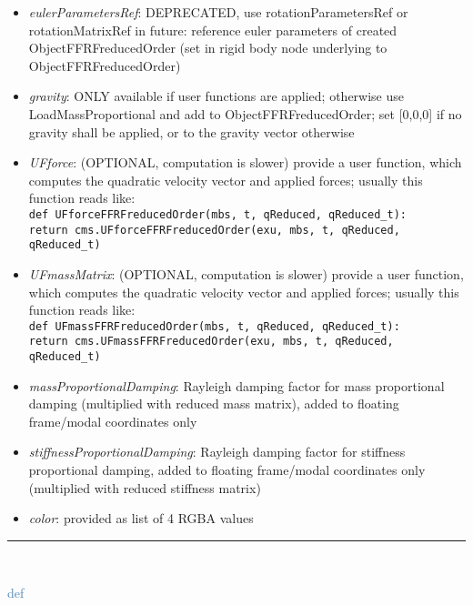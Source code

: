 \begin{itemize}[leftmargin=1.4cm]
\begin{itemize}[leftmargin=0.5cm]
\begin{itemize}[leftmargin=1.4cm]
\begin{itemize}[leftmargin=0.5cm]
\begin{itemize}[leftmargin=0.7cm]
\begin{itemize}[leftmargin=1.2cm]
    \item[] {\it   eulerParametersRef}: DEPRECATED, use rotationParametersRef or rotationMatrixRef in future: reference euler parameters of created ObjectFFRFreducedOrder (set in rigid body node underlying to ObjectFFRFreducedOrder)
    \item[] {\it   gravity}: ONLY available if user functions are applied; otherwise use LoadMassProportional and add to ObjectFFRFreducedOrder; set [0,0,0] if no gravity shall be applied, or to the gravity vector otherwise
    \item[] {\it   UFforce}: (OPTIONAL, computation is slower) provide a user function, which computes the quadratic velocity vector and applied forces; usually this function reads like:\\ \texttt{def UFforceFFRFreducedOrder(mbs, t, qReduced, qReduced\_t):\\ \phantom{XXXX}return cms.UFforceFFRFreducedOrder(exu, mbs, t, qReduced, qReduced\_t)}
    \item[] {\it   UFmassMatrix}: (OPTIONAL, computation is slower) provide a user function, which computes the quadratic velocity vector and applied forces; usually this function reads like:\\ \texttt{def UFmassFFRFreducedOrder(mbs, t, qReduced, qReduced\_t):\\  \phantom{XXXX}return cms.UFmassFFRFreducedOrder(exu, mbs, t, qReduced, qReduced\_t)}
    \item[] {\it   massProportionalDamping}: Rayleigh damping factor for mass proportional damping (multiplied with reduced mass matrix), added to floating frame/modal coordinates only
    \item[] {\it   stiffnessProportionalDamping}: Rayleigh damping factor for stiffness proportional damping, added to floating frame/modal coordinates only (multiplied with reduced stiffness matrix)
    \item[] {\it   color}: provided as list of 4 RGBA values
  \end{itemize}
\vspace{12pt}\end{itemize}
%
\noindent\rule{8cm}{0.75pt}\vspace{1pt} \\ 
\begin{flushleft}
\noindent \textcolor{steelblue}{def {\bf {}}}\label{sec:FEM:ObjectFFRFreducedOrderInterface:UFmassFFRFreducedOrder}

\end{flushleft}
\end{itemize}
\end{itemize}
\end{itemize}
\end{itemize}
